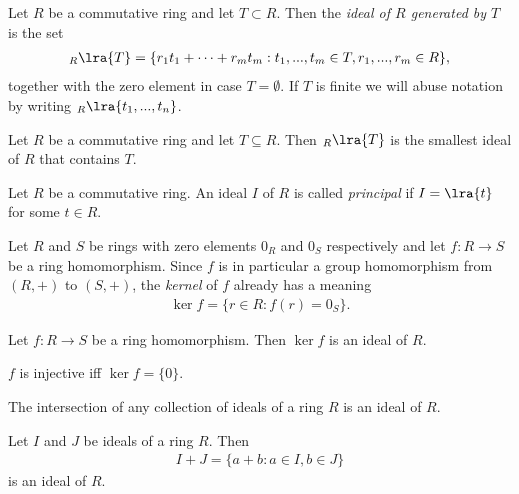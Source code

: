 \documentclass{article}
\begin{document}
\begin{definition}
	Let $R$ be a commutative ring and let $T\subset R$. Then the \emph{ideal of $R$
		generated by $T$} is the set
	\begin{align*}
		_R\lra{T} = \{r_1t_1+\cdots+r_mt_m : t_1,...,t_m\in T,r_1,...,r_m\in R\},
	\end{align*}
	together with the zero element in case $T=\emptyset$. If $T$ is finite we will
	abuse notation by writing $_R\lra{t_1,...,t_n}$.
\end{definition}

\begin{proposition}[Notes 3.4.14]
	Let $R$ be a commutative ring and let $T\subseteq R$. Then $_R\lra{T}$ is the
	smallest ideal of $R$ that contains $T$.
\end{proposition}

\begin{definition}
	Let $R$ be a commutative ring. An ideal $I$ of $R$ is called \emph{principal} if
	$I=\lra{t}$ for some $t\in R$.
\end{definition}

\begin{definition}
	Let $R$ and $S$ be rings with zero elements $0_R$ and $0_S$ respectively and
	let $f:R\to S$ be a ring homomorphism. Since $f$ is in particular a group homomorphism
	from $(R,+)$ to $(S,+)$, the \emph{kernel} of $f$ already has a meaning
	\begin{align*}
		\ker f = \{r\in R : f(r) = 0_S\}.
	\end{align*}
\end{definition}

\begin{proposition}[Notes 3.4.18]
	Let $f:R\to S$ be a ring homomorphism. Then $\ker f$ is an ideal of $R$.
\end{proposition}

\begin{lemma}[Notes 3.4.20]
	$f$ is injective iff $\ker f = \{0\}$.
\end{lemma}

\begin{lemma}[Notes 3.4.21]
	The intersection of any collection of ideals of a ring $R$ is an ideal of $R$.
\end{lemma}

\begin{lemma}[Notes 3.4.22]
	Let $I$ and $J$ be ideals of a ring $R$. Then
	\begin{align*}
		I+J=\{a+b:a\in I, b\in J\}
	\end{align*}
	is an ideal of $R$.
\end{lemma}
\end{document}
